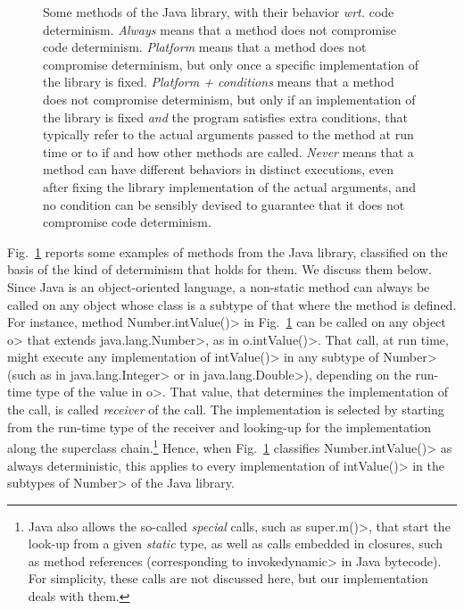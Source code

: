 \begin{figure}[t]
\begin{center}
\begin{tabular}{|l||C{1cm}|C{1.25cm}|C{1.57cm}|C{1cm}|}
    \end{tabular}
  \end{center}
  \caption{Some methods of the Java library, with their behavior \emph{wrt.} code determinism.
\emph{Always} means that a method does not compromise code determinism.
\emph{Platform} means that
a method does not compromise determinism, but only once a specific implementation
of the library is fixed. \emph{Platform + conditions} means that a method
does not compromise determinism, but only if an implementation of the library is fixed
\emph{and} the program satisfies extra conditions, that typically refer to
the actual arguments passed to the method at run time or to if and how
other methods are called. \emph{Never} means
that a method can have different behaviors in distinct executions,
even after fixing the library implementation of the actual arguments, and no
condition can be sensibly devised to guarantee that it does not compromise code
determinism.}\label{fig:determinism}
\end{figure}

Fig.~\ref{fig:determinism} reports some examples of methods
from the Java library, classified
on the basis of the kind of determinism that holds for them.
We discuss them below. Since Java is an object-oriented language,
a non-static method can always be called on any object whose class
is a subtype of that where the method is defined. For instance, method \<Number.intValue()> in
Fig.~\ref{fig:determinism} can be called on any object \<o> that extends
\<java.lang.Number>, as in \<o.intValue()>. That call, at run time, might
execute any implementation of \<intValue()> in any subtype of \<Number>
(such as in \<java.lang.Integer> or in \<java.lang.Double>), depending on the run-time
type of the value in \<o>. That value, that determines the implementation of the call, is called
\emph{receiver} of the call.
The implementation is selected by starting from the run-time type of the receiver
and looking-up for the implementation along the superclass
chain.\footnote{Java also allows the so-called \emph{special} calls, such as
   \<super.m()>, that start the look-up from a given \emph{static}
type, as well as calls embedded in closures, such as method references
(corresponding to \<invokedynamic> in Java bytecode). For simplicity,
these calls are not discussed here, but our implementation deals with them.}
Hence, when Fig.~\ref{fig:determinism} classifies \<Number.intValue()> as always
deterministic, this applies to every implementation of
\<intValue()> in the subtypes of \<Number> of the Java library.

